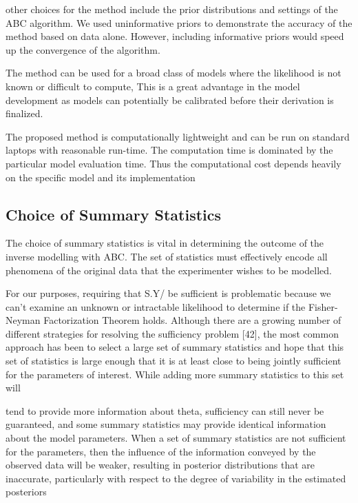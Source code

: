 other choices for the method include the prior distributions and settings of the ABC algorithm. We used uninformative priors to demonstrate the accuracy of the method based on data alone. However, including informative priors would speed up the convergence of the algorithm. 

The method can be used for a broad class of models where the likelihood is not known or difficult to compute, This is a great advantage in the model development as models can potentially be calibrated before their derivation is finalized.

The proposed method is computationally lightweight and can be run on standard laptops with reasonable run-time. The computation time is dominated by the particular model evaluation time. Thus the computational cost depends heavily on the specific model and its implementation

\subsection{Choice of Summary Statistics}

The choice of summary statistics is vital in determining the outcome of the inverse modelling with ABC. The set of statistics must effectively encode all phenomena of the original data that the experimenter wishes to be modelled. 

For our purposes, requiring that S.Y/ be sufficient is problematic because we
can’t examine an unknown or intractable likelihood to determine if the Fisher- Neyman Factorization Theorem holds. Although there are a growing number of different strategies for resolving the sufficiency problem [42], the most common approach has been to select a large set of summary statistics and hope that this set of statistics is large enough that it is at least close to being jointly sufficient for the parameters of interest. While adding more summary statistics to this set will

tend to provide more information about theta, sufficiency can still never be guaranteed, and some summary statistics may provide identical information about the model parameters. When a set of summary statistics are not sufficient for the parameters, then the influence of the information conveyed by the observed data will be weaker, resulting in posterior distributions that are inaccurate, particularly with respect to the degree of variability in the estimated posteriors


